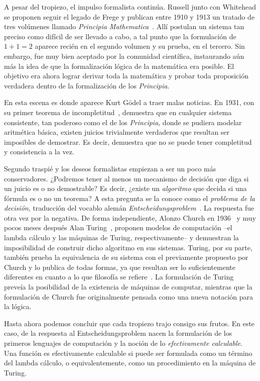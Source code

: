 A pesar del tropiezo, el impulso formalista continúa. Russell junto con Whitehead se proponen seguir el legado de Frege y publican entre 1910 y 1913 un tratado de tres volúmenes llamado {\it Principia Mathematica}~. Allí postulan un sistema tan preciso como difícil de ser llevado a cabo, a tal punto que la formulación de $1 + 1 = 2$ aparece recién en el segundo volumen y su prueba, en el tercero. Sin embargo, fue muy bien aceptado por la comunidad científica, instaurando aún más la idea de que la formalización lógica de la matemática era posible. El objetivo era ahora lograr derivar toda la matemática y probar toda proposición verdadera dentro de la formalización de los {\it Principia}.

En esta escena es donde aparece Kurt Gödel a traer malas noticias. En 1931, con su primer teorema de incompletitud~, demuestra que en cualquier sistema consistente, tan poderoso como el de los {\it Principia}, donde se pudiera modelar aritmética básica, existen juicios trivialmente verdaderos que resultan ser imposibles de demostrar. Es decir, demuestra que no se puede tener completitud y consistencia a la vez.

Segundo traspié y los deseos formalistas empiezan a ser un poco más conservadores. ¿Podremos tener al menos un mecanismo de decisión que diga si un juicio es o no demostrable? Es decir, ¿existe un {\it algoritmo} que decida si una fórmula es o no un teorema? A esta pregunta se la conoce como el {\it problema de la decisión}, traducción del vocablo alemán {\it Entscheidungsproblem}~. La respuesta fue otra vez por la negativa. De forma independiente, Alonzo Church en 1936~ y muy pocos meses después Alan Turing~, proponen modelos de computación --el lambda cálculo y las máquinas de Turing, respectivamente-- y demuestran la imposibilidad de construir dicho algoritmo en sus sistemas. Turing, por su parte, también prueba la equivalencia de su sistema con el previamente propuesto por Church y lo publica de todas formas, ya que resultan ser lo suficientemente diferentes en cuanto a lo que filosofía se refiere~. La formulación de Turing preveía la posibilidad de la existencia de máquinas de computar, mientras que la formulación de Church fue originalmente pensada como una nueva notación para la lógica.

Hasta ahora podemos concluir que cada tropiezo trajo consigo sus frutos. En este caso, de la respuesta al Entscheidungsproblem nacen la formulación de los primeros lenguajes de computación y la noción de lo {\it efectivamente calculable}. Una función es efectivamente calculable si puede ser formulada como un término del lambda cálculo, o equivalentemente, como un procedimiento en la máquina de Turing.

